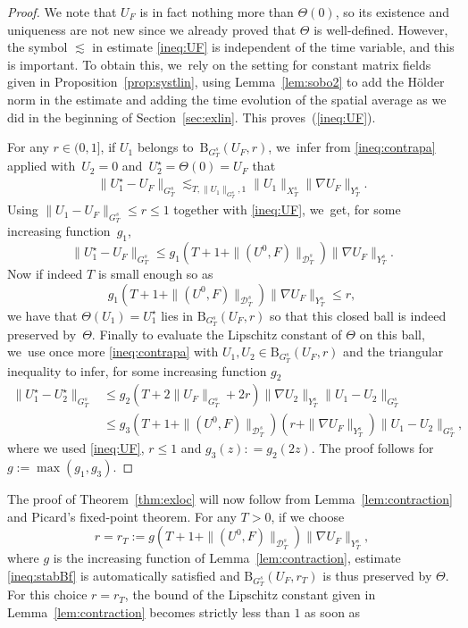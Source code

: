 \documentclass[JEP,XML,SOM,Unicode,published]{cedram}
\theoremstyle{definition}
\newcommand\B{\mathrm{B}}
\begin{document}
\begin{proof}
We note that $U_F$ is in fact nothing more than $\Theta(0)$, so its existence and uniqueness are not new since we already proved that $\Theta$ is well-defined. However, the symbol $\lesssim$ in estimate \eqref{ineq:UF} is independent of the time variable, and this is important. To obtain this, we~rely on the setting for constant matrix fields given in Proposition~\ref{prop:systlin}, using Lemma~\ref{lem:sobo2} to add the Hölder norm in the estimate and adding the time evolution of the spatial average as we did in the beginning of Section~\ref{sec:exlin}. This proves~(\ref{ineq:UF}).

For any $r\in(0,1]$, if $U_1 $ belongs to~$\B_{G_T^s}(U_F,r)$, we~infer from \eqref{ineq:contrapa} applied with~$U_2=0$ and~$U_2^\star = \Theta(0)=U_F$ that
\begin{align}\label{ineq:stabBf}
\|U_1^\star - U_F\|_{G_T^s} \lesssim_{T,\|U_1\|_{G_T^s},1} \|U_1\|_{X_T^s}\|\nabla U_F\|_{Y_T^s}.
\end{align}
Using $\|U_1-U_F\|_{G_T^s}\!\leq\! r\! \leq\! 1$ together with \eqref{ineq:UF}, we~get, for some increasing function~$g_1$,
\[
\|U_1^\star - U_F\|_{G_T^s} \leq g_1(T+1+ \| (U^0,F)\| _{\mathcal D_T^{s}})\|\nabla U_F\|_{Y_T^s}.
\]
Now if indeed $T$ is small enough so as
\[
g_1(T+1+ \| (U^0,F)\| _{\mathcal D_T^{s}}) \|\nabla U_F\|_{Y_T^s} \leq r,
\]
we have that $\Theta(U_1) = U_1^\star$ lies in $\B_{G_T^s}(U_F,r)$ so that this closed ball is indeed preserved by~$\Theta$. Finally to evaluate the Lipschitz constant of $\Theta$ on this ball, we~use once more \eqref{ineq:contrapa} with $U_1,U_2\in \B_{G_T^s}(U_F,r)$ and the triangular inequality to infer, for some increasing function $g_2$
\begin{align*}
\|U_1^\star - U_2^\star\|_{G_T^s} &\leq g_2(T+2\|U_F\|_{G_T^s}+2r) \|\nabla U_2\|_{Y_T^s}\|U_1-U_2\|_{G_T^s}\\
&\le g_3(T+1+ \| (U^0,F)\| _{\mathcal D_T^{s}})(r+\|\nabla U_F\|_{Y_T^s}) \|U_1-U_2\|_{G_T^s},
\end{align*}
where we used \eqref{ineq:UF}, $r\leq 1$ and $g_3(z): = g_2(2z)$. The proof follows for $g:=\max(g_1,g_3)$.
\end{proof}
The proof of Theorem~\ref{thm:exloc} will now follow from Lemma~\ref{lem:contraction} and Picard's fixed-point theorem. For any $T>0$, if we choose
\[
r=r_T:= g(T+1+ \| (U^0,F)\| _{\mathcal D_T^{s}})\|\nabla U_F\|_{Y_T^s},
\]
where $g$ is the increasing function of Lemma~\ref{lem:contraction}, estimate \eqref{ineq:stabBf} is automatically satisfied and $\B_{G_T^s}(U_F,r_T)$ is thus preserved by $\Theta$. For this choice $r=r_T$, the bound of the Lipschitz constant given in Lemma~\ref{lem:contraction} becomes strictly less than $1$ as soon as
\end{document}
